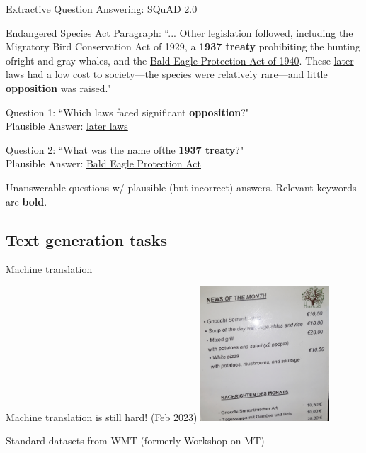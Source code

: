 \documentclass[12pt,aspectratio=169,handout]{beamer}
\begin{document}
\begin{frame}{Extractive Question Answering: SQuAD 2.0}
	
\begin{footnotesize}
\begin{example}
Endangered Species Act Paragraph: ``... Other legislation followed, including the Migratory Bird Conservation Act of 1929, a \textbf{1937 treaty} prohibiting the hunting ofright and gray whales, and the \underline{Bald Eagle Protection Act of 1940}. These \underline{later laws} had a low cost to society---the species were relatively rare---and little \textbf{opposition} was raised."

Question 1: ``Which laws faced significant \textbf{opposition}?" \\
Plausible Answer: \underline{later laws}

Question 2: ``What was the name ofthe \textbf{1937 treaty}?" \\
Plausible Answer: \underline{Bald Eagle Protection Act}
\end{example}
\end{footnotesize}

Unanswerable questions w/ plausible (but incorrect) answers. Relevant keywords are \textbf{bold}.

	
	
\end{frame}


\subsection{Text generation tasks}


\begin{frame}{Machine translation}

Machine translation is still hard! (Feb 2023)
\includegraphics[width=13em]{img/mtex.jpg}

Standard datasets from WMT (formerly Workshop on MT)



\end{frame}
\end{document}
